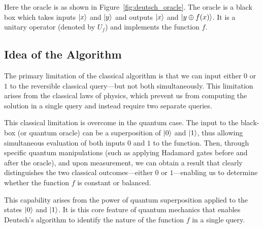 Here the oracle is as shown in Figure~\ref{fig:deutsch_oracle}. The oracle is a black box which takes inputs $\ket{x}$ and $\ket{y}$ and outputs $\ket{x}$ and $\ket{y \oplus f(x)}$. It is a unitary operator (denoted by $U_f$) and implements the function $f$.


\subsection{Idea of the Algorithm}
The primary limitation of the classical algorithm is that we can input either $0$ or $1$ to the reversible classical query—but not both simultaneously. This limitation arises from the classical laws of physics, which prevent us from computing the solution in a single query and instead require two separate queries. 

This classical limitation is overcome in the quantum case. The input to the black-box (or quantum oracle) can be a superposition of $\ket{0}$ and $\ket{1}$, thus allowing simultaneous evaluation of both inputs $0$ and $1$ to the function. Then, through specific quantum manipulations (such as applying Hadamard gates before and after the oracle), and upon measurement, we can obtain a result that clearly distinguishes the two classical outcomes—either $0$ or $1$—enabling us to determine whether the function $f$ is constant or balanced. 

This capability arises from the power of quantum superposition applied to the states $\ket{0}$ and $\ket{1}$. It is this core feature of quantum mechanics that enables Deutsch's algorithm to identify the nature of the function $f$ in a single query.

